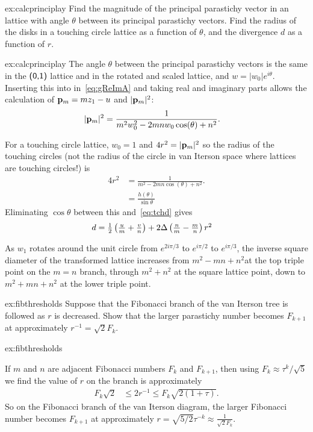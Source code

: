 \begin{jExercise}{ex:calcprinciplay}
	Find the magnitude of the principal parastichy vector in an   lattice with angle $\theta$ between its principal parastichy vectors.
	Find the radius of the disks in a touching circle lattice as a function of $\theta$, and the divergence $d$ as a function of $r$.
\end{jExercise}
\begin{jAnswer}{ex:calcprinciplay}
The angle  $\theta$ between the principal parastichy vectors is the same in the $\textsf{(0,1)}$ lattice and in the rotated and scaled lattice, and  $w=|w_0|e^{i\theta}$.  Inserting this into in~\eqref{eq:gReImA} and taking real and imaginary parts allows the calculation of ${\mathbf p}_{m}=m z_1 -u$ and $|{\mathbf p}_{m}|^2$: 
	\begin{align}
	|{\mathbf p}_{m}|^2 &=\frac{1}{m^2 w_0^2-2 m n w_0 \cos (\theta )+n^2}.
		\end{align}
	
		
For a touching circle lattice, $w_0=1$ and $4r^2=	|{\mathbf p}_{m}|^2$ so the radius of the touching circles (not the radius of the circle in van Iterson space where lattices are touching circles!) is
\begin{align}
4 r^{2}  &=\frac{1}{ m^2-2 m n \cos (\theta )+n^2}.
\\
&= \frac{h(\theta)}{\sin \theta}
\end{align}
Eliminating $\cos\theta$ between this and~\eqref{eq:tchd} gives
\begin{align}
d&=		\textstyle{\frac{1}{2}}
\left(\frac{u}{m}+\frac{v}{n}\right)
+ 2\Delta  \left(\frac{n}{m}-\frac{m}{n}\right)r^2
\end{align}

As $w_1$ rotates around the unit circle from $e^{2i\pi/3}$ to $e^{i\pi/2}$ to $e^{i\pi/3}$, the inverse square diameter of the transformed lattice increases from $m^2-mn+n^2$at the top triple point on the $m=n$ branch, through  $m^2+n^2$ at the square lattice point, down to $m^2+mn+n^2$  at the lower triple point.
\end{jAnswer}

\begin{jExercise}{ex:fibthresholds}
Suppose that the Fibonacci branch of the van Iterson tree is followed as $r$ is decreased.
Show that the larger parastichy number becomes $F_{k+1}$ at approximately  $r^{-1}={\sqrt{2}F_k}$.
\end{jExercise}
\begin{jAnswer}{ex:fibthresholds}

If $m$ and $n$ are adjacent Fibonacci numbers $F_{k}$ and $F_{k+1}$, then using $F_k\approx \tau^k/\sqrt{5}
$ we find the value of $r$ on the branch is approximately
	\begin{align}
  F_k \sqrt{2} &\leq	2 r^{-1}  \leq F_k \sqrt{2(1+\tau)}.
\end{align}
So on the Fibonacci branch of the van Iterson diagram, 
the larger Fibonacci number becomes $F_{k+1}$ at approximately $r=\sqrt{5/2}\tau^{-k}\approx \frac{1}{\sqrt{2}F_k}$.
\end{jAnswer}





